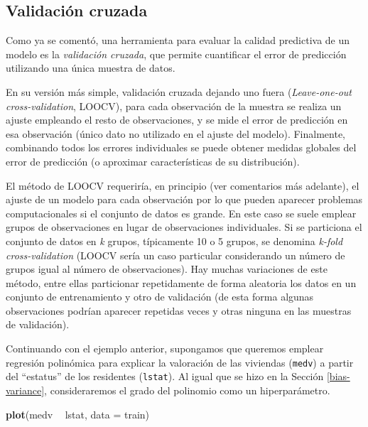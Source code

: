 \documentclass[
]{book}
\newenvironment{Shaded}{\begin{snugshade}}{\end{snugshade}}
\newcommand{\DataTypeTok}[1]{\textcolor[rgb]{0.13,0.29,0.53}{#1}}
\newcommand{\KeywordTok}[1]{\textcolor[rgb]{0.13,0.29,0.53}{\textbf{#1}}}
\newcommand{\NormalTok}[1]{#1}
\newcommand{\OperatorTok}[1]{\textcolor[rgb]{0.81,0.36,0.00}{\textbf{#1}}}
\newcommand{\StringTok}[1]{\textcolor[rgb]{0.31,0.60,0.02}{#1}}
\theoremstyle{break}
\theoremstyle{definition}
\theoremstyle{definition}
\theoremstyle{definition}
\theoremstyle{remark}
\begin{document}
\hypertarget{cv}{%
\subsection{Validación cruzada}\label{cv}}

Como ya se comentó, una herramienta para evaluar la calidad predictiva de un modelo es la \emph{validación cruzada}, que permite cuantificar el error de predicción utilizando una única muestra de datos.

En su versión más simple, validación cruzada dejando uno fuera (\emph{Leave-one-out cross-validation}, LOOCV), para cada observación de la muestra se realiza un ajuste empleando el resto de observaciones, y se mide el error de predicción en esa observación (único dato no utilizado en el ajuste del modelo).
Finalmente, combinando todos los errores individuales se puede obtener medidas globales del error de predicción (o aproximar características de su distribución).

El método de LOOCV requeriría, en principio (ver comentarios más adelante), el ajuste de un modelo para cada observación por lo que pueden aparecer problemas computacionales si el conjunto de datos es grande.
En este caso se suele emplear grupos de observaciones en lugar de observaciones individuales.
Si se particiona el conjunto de datos en \emph{k} grupos, típicamente 10 o 5 grupos, se denomina \emph{k-fold cross-validation} (LOOCV sería un caso particular considerando un número de grupos igual al número de observaciones).
Hay muchas variaciones de este método, entre ellas particionar repetidamente de forma aleatoria los datos en un conjunto de entrenamiento y otro de validación (de esta forma algunas observaciones podrían aparecer repetidas veces y otras ninguna en las muestras de validación).

Continuando con el ejemplo anterior, supongamos que queremos emplear regresión polinómica para explicar la valoración de las viviendas (\texttt{medv}) a partir del ``estatus'' de los residentes (\texttt{lstat}).
Al igual que se hizo en la Sección \ref{bias-variance}, consideraremos el grado del polinomio como un hiperparámetro.

\begin{Shaded}
\begin{Highlighting}[]
\KeywordTok{plot}\NormalTok{(medv }\OperatorTok{~}\StringTok{ }\NormalTok{lstat, }\DataTypeTok{data =}\NormalTok{ train)}
\end{Highlighting}
\end{Shaded}
\end{document}
